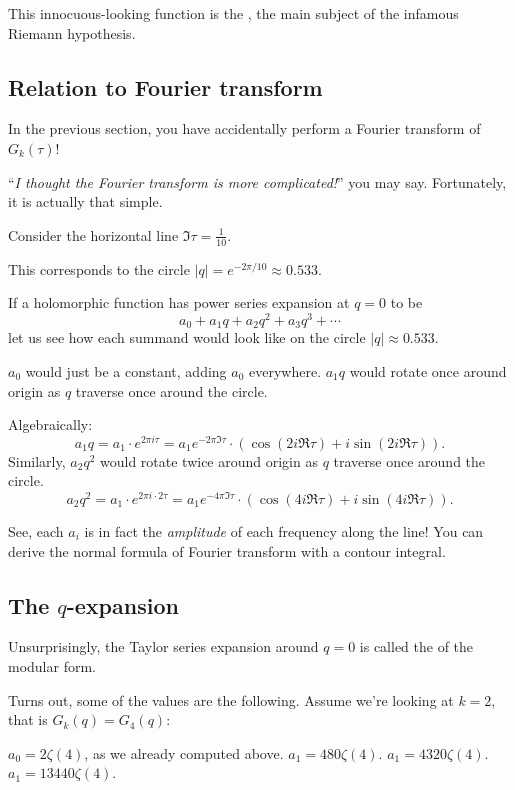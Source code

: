 \begin{remark}
	This innocuous-looking function is the , the main subject of the
	infamous Riemann hypothesis.
\end{remark}

\subsection{Relation to Fourier transform}

In the previous section, you have accidentally perform a Fourier transform of $G_k(\tau)$!

``\emph{I thought the Fourier transform is more complicated!}'' you may say.
Fortunately, it is actually that simple.

Consider the horizontal line $\Im \tau = \frac{1}{10}$.

This corresponds to the circle $|q| = e^{-2 \pi/10} \approx 0.533$.


If a holomorphic function has power series expansion at $q=0$ to be
\[ a_0+a_1 q+a_2 q^2+a_3 q^3+\cdots \]
let us see how each summand would look like on the circle $|q|\approx 0.533$.
\begin{itemize}
	\ii $a_0$ would just be a constant, adding $a_0$ everywhere.
	\ii $a_1 q$ would rotate once around origin as $q$ traverse once around the circle.

	Algebraically:
	\[ a_1 q = a_1 \cdot e^{2 \pi i \tau}
	= a_1 e^{-2 \pi \Im\tau} \cdot (\cos (2i \Re \tau) + i \sin (2i \Re \tau)).  \]
	\ii Similarly, $a_2 q^2$ would rotate twice around origin as $q$ traverse once around the
	circle.
	\[ a_2 q^2 = a_1 \cdot e^{2 \pi i \cdot 2 \tau}
	= a_1 e^{-4 \pi \Im\tau} \cdot (\cos (4i \Re \tau) + i \sin (4i \Re \tau)).  \]
\end{itemize}
See, each $a_i$ is in fact the \emph{amplitude} of each frequency along the line!
You can derive the normal formula of Fourier transform with a contour integral.

\subsection{The $q$-expansion}

Unsurprisingly, the Taylor series expansion around $q=0$ is called the  of the
modular form.

Turns out, some of the values are the following. Assume we're looking at $k=2$, that is $G_k(q) =
G_4(q)$:
\begin{itemize}
	\ii $a_0 = 2 \zeta(4)$, as we already computed above.
	\ii $a_1 = 480 \zeta(4)$.
	\ii $a_1 = 4320 \zeta(4)$.
	\ii $a_1 = 13440 \zeta(4)$.
\end{itemize}

